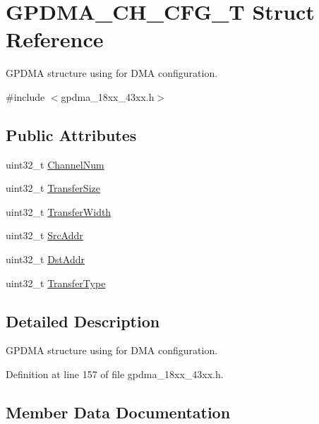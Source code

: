 \hypertarget{struct_g_p_d_m_a___c_h___c_f_g___t}{}\section{G\+P\+D\+M\+A\+\_\+\+C\+H\+\_\+\+C\+F\+G\+\_\+T Struct Reference}
\label{struct_g_p_d_m_a___c_h___c_f_g___t}


G\+P\+D\+MA structure using for D\+MA configuration.  




{\ttfamily \#include $<$gpdma\+\_\+18xx\+\_\+43xx.\+h$>$}

\subsection*{Public Attributes}
\begin{DoxyCompactItemize}
\item 
uint32\+\_\+t \hyperlink{struct_g_p_d_m_a___c_h___c_f_g___t_a9a37cb463108848cc37e79d230f34602}{Channel\+Num}
\item 
uint32\+\_\+t \hyperlink{struct_g_p_d_m_a___c_h___c_f_g___t_a5666efb9edb055974b590443ea45ed7b}{Transfer\+Size}
\item 
uint32\+\_\+t \hyperlink{struct_g_p_d_m_a___c_h___c_f_g___t_a7aff974420b56393365cc335015ba8df}{Transfer\+Width}
\item 
uint32\+\_\+t \hyperlink{struct_g_p_d_m_a___c_h___c_f_g___t_a53adde93dea1ba4ce81af0fd4bd3e66e}{Src\+Addr}
\item 
uint32\+\_\+t \hyperlink{struct_g_p_d_m_a___c_h___c_f_g___t_a6e67f866c02d9a27662c798bac0554b8}{Dst\+Addr}
\item 
uint32\+\_\+t \hyperlink{struct_g_p_d_m_a___c_h___c_f_g___t_a6c21f3fe48e5e23443a324f9a42a3886}{Transfer\+Type}
\end{DoxyCompactItemize}


\subsection{Detailed Description}
G\+P\+D\+MA structure using for D\+MA configuration. 

Definition at line 157 of file gpdma\+\_\+18xx\+\_\+43xx.\+h.



\subsection{Member Data Documentation}
\mbox{\label{struct_g_p_d_m_a___c_h___c_f_g___t_a9a37cb463108848cc37e79d230f34602}} 
